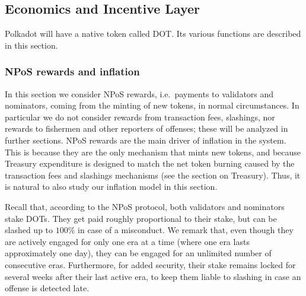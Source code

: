 \subsection{Economics and Incentive Layer}\label{sec:economics}

Polkadot will have a native token called DOT. Its various functions are described in this section.



\subsubsection{NPoS rewards and inflation}

In this section we consider NPoS rewards, i.e.~payments to validators and nominators, coming from the minting of new tokens, 
in normal circumstances. In particular we do not consider rewards from transaction fees, slashings, nor rewards to fishermen 
and other reporters of offenses; these will be analyzed in further sections. 
NPoS rewards are the main driver of inflation in the system. 
This is because they are the only mechanism that mints new tokens, and because Treasury expenditure is designed to match 
the net token burning caused by the transaction fees and slashings mechanisms (see the section on Treasury). 
Thus, it is natural to also study our inflation model in this section.

Recall that, according to the NPoS protocol, both validators and nominators stake DOTs. 
They get paid roughly proportional to their stake, but can be slashed up to $100\%$ in case of a misconduct. 
We remark that, even though they are actively engaged for only one era at a time (where one era lasts approximately one day), 
they can be engaged for an unlimited number of consecutive eras. 
Furthermore, for added security, their stake remains locked for several weeks after their last active era, 
to keep them liable to slashing in case an offense is detected late.

